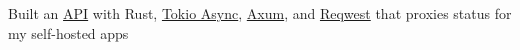 {Built an \href{https://status.sachiniyer.com}{API} with Rust, \href{https://tokio.rs/tokio/tutorial/async}{Tokio Async}, \href{https://docs.rs/axum/latest/axum/}{Axum}, and \href{https://docs.rs/reqwest/latest/reqwest/}{Reqwest} that proxies status for my self-hosted apps}
